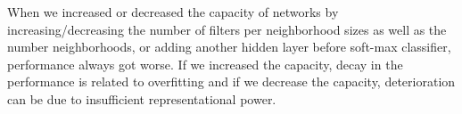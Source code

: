 When we increased or decreased the capacity of networks by increasing/decreasing the number of filters per neighborhood sizes as well as the number neighborhoods, or adding another hidden layer before soft-max classifier, performance always got worse.
If we increased the capacity, decay in the performance is related to overfitting and if we decrease the capacity, deterioration can be due to insufficient representational power.



